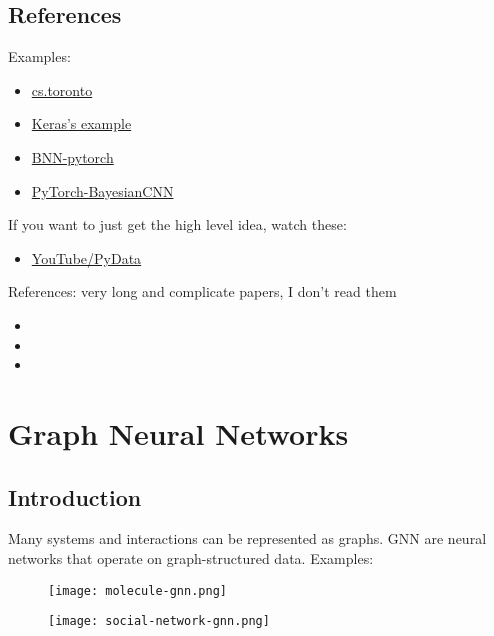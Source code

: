 \subsection{References}
Examples:
\begin{itemize}
	\item \href{https://www.cs.toronto.edu/~duvenaud/distill_bayes_net/public/}{cs.toronto}
	\item \href{https://keras.io/examples/keras_recipes/bayesian_neural_networks/}{Keras's example}
	\item \href{https://github.com/Harry24k/bayesian-neural-network-pytorch}{BNN-pytorch}
	\item \href{https://github.com/kumar-shridhar/PyTorch-BayesianCNN}{PyTorch-BayesianCNN}
\end{itemize}

If you want to just get the high level idea, watch these:
\begin{itemize}
	\item \href{https://youtu.be/s0S6HFdPtlA}{YouTube/PyData}
\end{itemize}

References: \note very long and complicate papers, I don't read them
\begin{itemize}
	\item {}
	\item {}
	\item {}
\end{itemize}

\section{Graph Neural Networks}
\subsection{Introduction}
Many systems and interactions can be represented as graphs. \ac{GNN} are neural networks that operate on graph-structured data. Examples:

\begin{figure}[hbt!]
	\centering
	\begin{minipage}{.47\textwidth}
		\centering
		\texttt{[image: molecule-gnn.png]}
	\end{minipage}
	\hfil
	\begin{minipage}{.47\textwidth}
		\centering
		\texttt{[image: social-network-gnn.png]}
	\end{minipage}
\end{figure}

